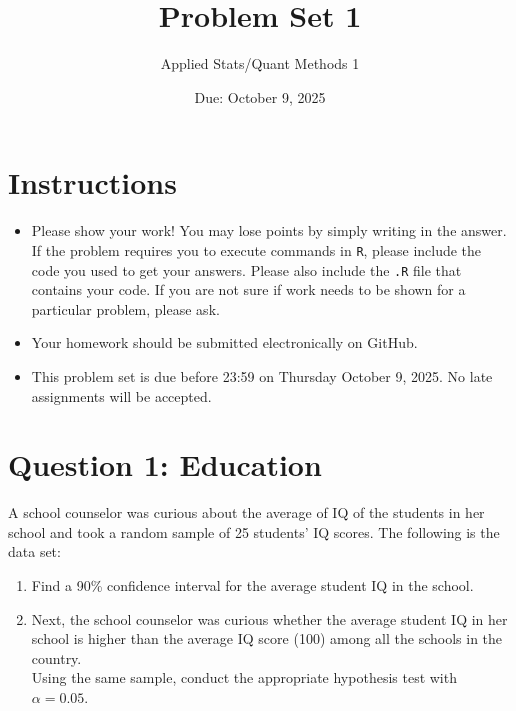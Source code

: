 \documentclass[12pt,letterpaper]{article}
\title{Problem Set 1}
\date{Due: October 9, 2025}
\author{Applied Stats/Quant Methods 1}
\begin{document}
	\maketitle
	
	\section*{Instructions}
	\begin{itemize}
	\item Please show your work! You may lose points by simply writing in the answer. If the problem requires you to execute commands in \texttt{R}, please include the code you used to get your answers. Please also include the \texttt{.R} file that contains your code. If you are not sure if work needs to be shown for a particular problem, please ask.
\item Your homework should be submitted electronically on GitHub.
\item This problem set is due before 23:59 on Thursday October 9, 2025. No late assignments will be accepted.
	\end{itemize}
	
	\vspace{1cm}
	\section*{Question 1: Education}

A school counselor was curious about the average of IQ of the students in her school and took a random sample of 25 students' IQ scores. The following is the data set:\\
\vspace{.5cm}

  

\vspace{1cm}

\begin{enumerate}
	\item Find a 90\% confidence interval for the average student IQ in the school.\\
	
	\item Next, the school counselor was curious  whether  the average student IQ in her school is higher than the average IQ score (100) among all the schools in the country.\\ 
	
	\noindent Using the same sample, conduct the appropriate hypothesis test with $\alpha=0.05$.
\end{enumerate}
\end{document}
